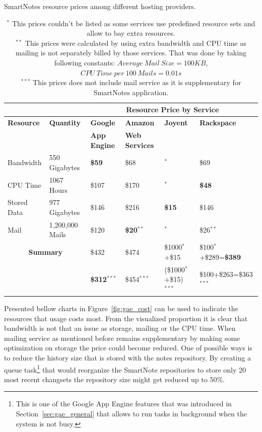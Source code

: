\begin{table}[h]
\centering
\caption{SmartNotes resource prices among different hosting providers.}
\caption*{ $^{*}$ This prices couldn't be listed as some services use predefined resource sets and allow to bay extra resources.\\
 $^{**}$ This prices were calculated by using extra bandwidth and CPU time as mailing is not separately billed by those services. That was done by taking following constants: $Average\ Mail\ Size = 100KB$, $CPU\ Time\ per\ 100\ Mails = 0.01s$\\
 $^{***}$ This prices does mot include mail service as it is supplementary for SmartNotes application.}
\label{tab:services_price_compare}
\begin{tabular}{|l|l|l|l|l|l|} \cline{3-6}
		  \multicolumn{2}{c|}{}       &\multicolumn{4}{c|}{\textbf{Resource Price by Service}} \\ \hline \hline
\textbf{Resource} &\textbf{Quantity} &\textbf{Google}        &\textbf{Amazon}         &\textbf{Joyent} &\textbf{Rackspace} \\ 
			     &			   &\textbf{App Engine} &\textbf{Web Services} &           &  \\ \hline \hline
Bandwidth &550 Gigabytes &\textbf{\$59} &\$68 &$^{*}$ &\$69 \\ \hline
CPU Time &1067 Hours &\$107 &\$170 &$^{*}$  &\textbf{\$48}\\ \hline
Stored Data &977 Gigabytes &\$146 & \$216 &\textbf{\$15} &\$146 \\ \hline
Mail &1,200,000 Mails &\$120 &\textbf{\$20}$^{**}$ &$^{*}$ &\$26$^{**}$ \\ \hline \hline
\multicolumn{2}{|c|}{\textbf{Summary}} &\$432 &\$474 &\$1000$^{*}$+\$15 &\$100$^{*}$+\$289=\textbf{\$389}\\ 
\multicolumn{2}{|c|}{} &\textbf{\$312}$^{***}$ &\$454$^{***}$ &(\$1000$^{*}$+\$15)$^{***}$ &\$100+\$263=\$363$^{***}$\\ \hline \hline
\end{tabular}
\end{table}

Presented bellow charts in Figure~\ref{fig:gae_cost} can be used to indicate the resources that usage costs most. From the visualized proportion it is clear that bandwidth is not that an issue as storage, mailing or the CPU time. When mailing service as mentioned before remains supplementary by making some optimization on storage the price could become reduced. One of possible ways is to reduce the history size that is stored with the notes repository. By creating a queue task\footnote{This is one of the Google App Engine features that was introduced in Section~\ref{sec:gae_general} that allows to run tasks in background when the system is not busy.} that would reorganize the SmartNote repositories to store only 20 most recent changsets the repository size might get reduced up to 50\%.      

